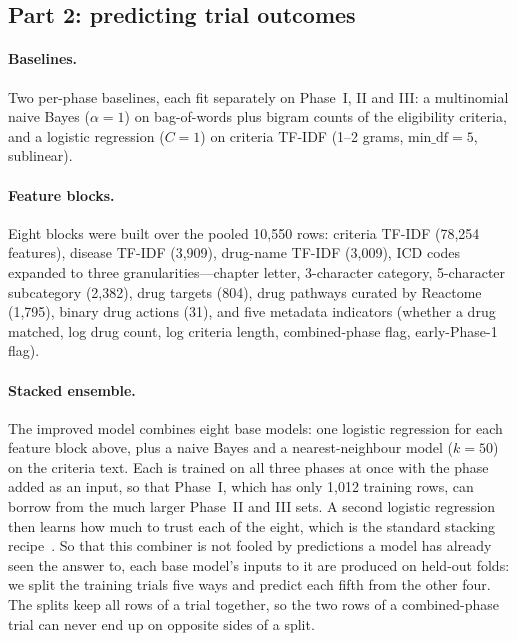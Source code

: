 \subsection{Part 2: predicting trial outcomes}

\paragraph{Baselines.}
Two per-phase baselines, each fit separately on Phase~I, II and III:
a multinomial naive Bayes ($\alpha = 1$) on bag-of-words plus bigram counts of the
eligibility criteria, and a logistic regression ($C = 1$) on criteria TF-IDF
(1--2 grams, $\mathrm{min\_df}=5$, sublinear).

\paragraph{Feature blocks.}
Eight blocks were built over the pooled 10,550 rows: criteria TF-IDF (78,254
features), disease TF-IDF (3,909), drug-name TF-IDF (3,009), ICD codes expanded to
three granularities---chapter letter, 3-character category, 5-character
subcategory (2,382), drug targets (804), drug pathways curated by Reactome~\cite{milacic2024reactome} (1,795), binary drug
actions (31), and five metadata indicators (whether a drug matched, log drug
count, log criteria length, combined-phase flag, early-Phase-1 flag).

\paragraph{Stacked ensemble.}
The improved model combines eight base models: one logistic regression for each
feature block above, plus a naive Bayes and a nearest-neighbour model
($k = 50$) on the criteria text. Each is trained on all three phases at once with
the phase added as an input, so that Phase~I, which has only 1,012 training rows,
can borrow from the much larger Phase~II and III sets. A second logistic
regression then learns how much to trust each of the eight, which is the standard
stacking recipe~\cite{wolpert1992stacked}. So that this combiner is not fooled by
predictions a model has already seen the answer to, each base model's inputs to it
are produced on held-out folds: we split the training trials five ways and predict
each fifth from the other four. The splits keep all rows of a trial together, so
the two rows of a combined-phase trial can never end up on opposite sides of a
split.

